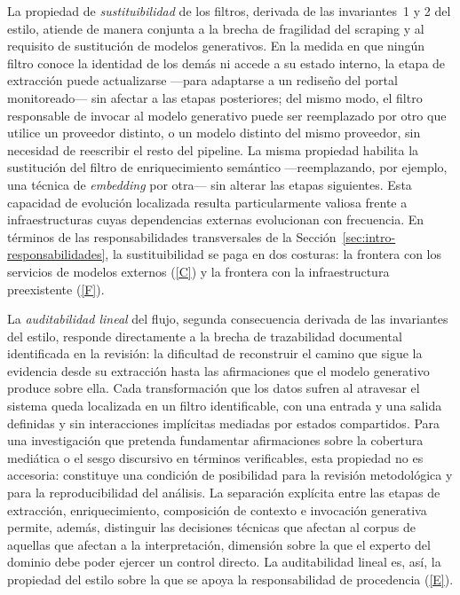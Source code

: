 \documentclass[12pt]{report}
\DeclareRobustCommand{\resp}[1]{\hyperref[tab:registro-responsabilidades]{\textcolor{respcolor}{[#1]}}}
\begin{document}
La propiedad de \textit{sustituibilidad} de los filtros, derivada de las invariantes~1 y 2 del estilo, atiende de manera conjunta a la brecha de fragilidad del scraping y al requisito de sustitución de modelos generativos. En la medida en que ningún filtro conoce la identidad de los demás ni accede a su estado interno, la etapa de extracción puede actualizarse ---para adaptarse a un rediseño del portal monitoreado--- sin afectar a las etapas posteriores; del mismo modo, el filtro responsable de invocar al modelo generativo puede ser reemplazado por otro que utilice un proveedor distinto, o un modelo distinto del mismo proveedor, sin necesidad de reescribir el resto del pipeline. La misma propiedad habilita la sustitución del filtro de enriquecimiento semántico ---reemplazando, por ejemplo, una técnica de \textit{embedding} por otra--- sin alterar las etapas siguientes. Esta capacidad de evolución localizada resulta particularmente valiosa frente a infraestructuras cuyas dependencias externas evolucionan con frecuencia. En términos de las responsabilidades transversales de la Sección~\ref{sec:intro-responsabilidades}, la sustituibilidad se paga en dos costuras: la frontera con los servicios de modelos externos (\resp{C}) y la frontera con la infraestructura preexistente (\resp{F}).

La \textit{auditabilidad lineal} del flujo, segunda consecuencia derivada de las invariantes del estilo, responde directamente a la brecha de trazabilidad documental identificada en la revisión: la dificultad de reconstruir el camino que sigue la evidencia desde su extracción hasta las afirmaciones que el modelo generativo produce sobre ella. Cada transformación que los datos sufren al atravesar el sistema queda localizada en un filtro identificable, con una entrada y una salida definidas y sin interacciones implícitas mediadas por estados compartidos. Para una investigación que pretenda fundamentar afirmaciones sobre la cobertura mediática o el sesgo discursivo en términos verificables, esta propiedad no es accesoria: constituye una condición de posibilidad para la revisión metodológica y para la reproducibilidad del análisis. La separación explícita entre las etapas de extracción, enriquecimiento, composición de contexto e invocación generativa permite, además, distinguir las decisiones técnicas que afectan al corpus de aquellas que afectan a la interpretación, dimensión sobre la que el experto del dominio debe poder ejercer un control directo. La auditabilidad lineal es, así, la propiedad del estilo sobre la que se apoya la responsabilidad de procedencia (\resp{E}).
\end{document}
